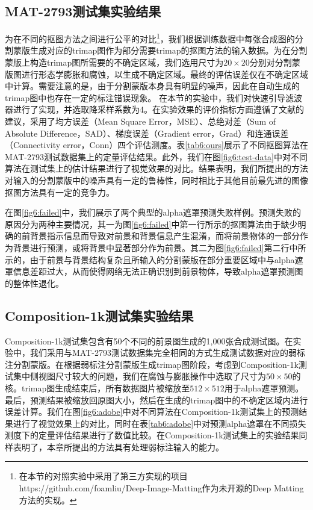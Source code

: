 \subsection{MAT-2793测试集实验结果}
为在不同的抠图方法之间进行公平的对比\footnote{在本节的对照实验中采用了第三方实现的项目https://github.com/foamliu/Deep-Image-Matting作为未开源的Deep Matting方法的实现。}，我们根据训练数据中每张合成图的分割蒙版生成对应的trimap图作为部分需要trimap的抠图方法的输入数据。为在分割蒙版上构造trimap图所需要的不确定区域，我们选用尺寸为$20\times20$分别对分割蒙版图进行形态学膨胀和腐蚀，以生成不确定区域。最终的评估误差仅在不确定区域中计算。需要注意的是，由于分割蒙版本身具有明显的噪声，因此在自动生成的trimap图中也存在一定的标注错误现象。
在本节的实验中，我们对快速引导滤波器\cite{he2015fast}进行了实现，并选取降采样系数为4。在实验效果的评价指标方面遵循了文献\parencite{rhemann2009perceptually}的建议，采用了均方误差（Mean Square Error，MSE）、总绝对差（Sum of Absolute Difference，SAD）、梯度误差（Gradient error，Grad）和连通误差（Connectivity error，Conn）四个评估测度。表\ref{tab6:ours}展示了不同抠图算法在MAT-2793测试数据集上的定量评估结果。此外，我们在图\ref{fig6:test-data}中对不同算法在测试集上的估计结果进行了视觉效果的对比。结果表明，我们所提出的方法对输入的分割蒙版中的噪声具有一定的鲁棒性，同时相比于其他目前最先进的图像抠图方法具有一定的竞争力。


在图\ref{fig6:failed}中，我们展示了两个典型的alpha遮罩预测失败样例。预测失败的原因分为两种主要情况，其一为图\ref{fig6:failed}中第一行所示的抠图算法由于缺少明确的前背景指示信息而导致对前景和背景信息产生混淆，而将前景物体的一部分作为背景进行预测，或将背景中显著部分作为前景。其二为图\ref{fig6:failed}第二行中所示的，由于前景与背景结构复杂且所输入的分割蒙版在部分重要区域中与alpha遮罩信息差距过大，从而使得网络无法正确识别到前景物体，导致alpha遮罩预测图的整体性退化。

\subsection{Composition-1k测试集实验结果}
Composition-1k测试集\cite{xu2017deep}包含有50个不同的前景图生成的1,000张合成测试图。在实验中，我们采用与MAT-2793测试数据集完全相同的方式生成测试数据对应的弱标注分割蒙版。在根据弱标注分割蒙版生成trimap图阶段，考虑到Composition-1k测试集中侧视图尺寸较大的问题，我们在腐蚀与膨胀操作中选取了尺寸为$50\times50$的核。trimap图生成结束后，所有数据图片被缩放至$512\times512$用于alpha遮罩预测。最后，预测结果被缩放回原图大小，然后在生成的trimap图中的不确定区域内进行误差计算。我们在图\ref{fig6:adobe}中对不同算法在Composition-1k测试集上的预测结果进行了视觉效果上的对比，同时在表\ref{tab6:adobe}中对预测alpha遮罩在不同损失测度下的定量评估结果进行了数值比较。在Composition-1k测试集上的实验结果同样表明了，本章所提出的方法具有处理弱标注输入的能力。

